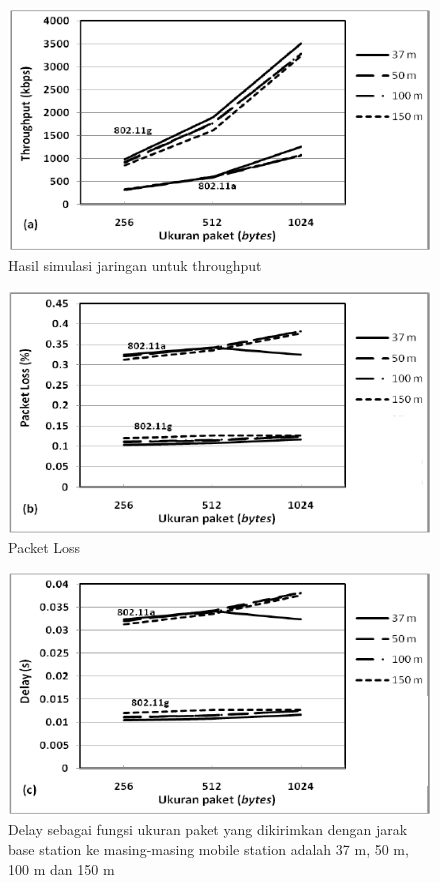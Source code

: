 \documentclass{jtetiproposalskripsi}
\begin{document}
\begin{figure}[ht!]
  \centering
    \includegraphics{gambar/4a}
    \caption{Hasil simulasi jaringan untuk throughput}
    \label{Hasil simulasi jaringan untuk throughput}
\end{figure}

\begin{figure}[ht!]
  \centering
    \includegraphics{gambar/4b}
    \caption{Packet Loss}
    \label{PacketLoss}
\end{figure}

\begin{figure}[ht!]

  \centering
    \includegraphics{gambar/4c}
    \caption{Delay sebagai fungsi ukuran paket yang dikirimkan dengan jarak base station ke masing-masing mobile station adalah 37 m, 50 m, 100 m dan 150 m}
    \label{Delay sebagai}
\end{figure}
\end{document}
